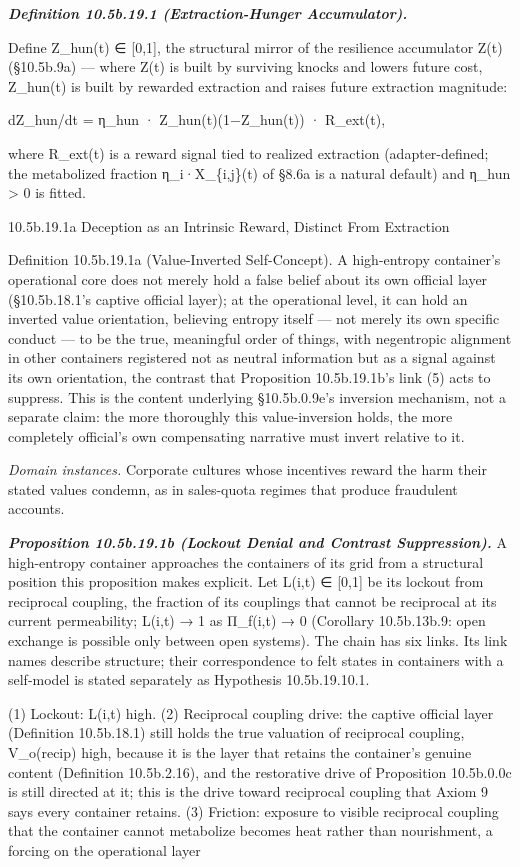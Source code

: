 \documentclass[
]{article}
\begin{document}
\emph{\textbf{Definition 10.5b.19.1 (Extraction-Hunger Accumulator).}}

Define Z\_hun(t) ∈ {[}0,1{]}, the structural mirror of the resilience
accumulator Z(t) (§10.5b.9a) --- where Z(t) is built by surviving knocks
and lowers future cost, Z\_hun(t) is built by rewarded extraction and
raises future extraction magnitude:

dZ\_hun/dt = η\_hun · Z\_hun(t)(1−Z\_hun(t)) · R\_ext(t),

where R\_ext(t) is a reward signal tied to realized extraction
(adapter-defined; the metabolized fraction η\_i·X\_\{i,j\}(t) of §8.6a
is a natural default) and η\_hun \textgreater{} 0 is fitted.

10.5b.19.1a Deception as an Intrinsic Reward, Distinct From Extraction

Definition 10.5b.19.1a (Value-Inverted Self-Concept). A high-entropy
container's operational core does not merely hold a false belief about
its own official layer (§10.5b.18.1's captive official layer); at the
operational level, it can hold an inverted value orientation, believing
entropy itself --- not merely its own specific conduct --- to be the
true, meaningful order of things, with negentropic alignment in other
containers registered not as neutral information but as a signal against
its own orientation, the contrast that Proposition 10.5b.19.1b's link
(5) acts to suppress. This is the content underlying §10.5b.0.9e's
inversion mechanism, not a separate claim: the more thoroughly this
value-inversion holds, the more completely official's own compensating
narrative must invert relative to it.

\emph{Domain instances.} Corporate cultures whose incentives reward the
harm their stated values condemn, as in sales-quota regimes that produce
fraudulent accounts.

\emph{\textbf{Proposition 10.5b.19.1b (Lockout Denial and Contrast
Suppression).}} A high-entropy container approaches the containers of
its grid from a structural position this proposition makes explicit. Let
L(i,t) ∈ {[}0,1{]} be its lockout from reciprocal coupling, the fraction
of its couplings that cannot be reciprocal at its current permeability;
L(i,t) → 1 as Π\_f(i,t) → 0 (Corollary 10.5b.13b.9: open exchange is
possible only between open systems). The chain has six links. Its link
names describe structure; their correspondence to felt states in
containers with a self-model is stated separately as Hypothesis
10.5b.19.10.1.

(1) Lockout: L(i,t) high. (2) Reciprocal coupling drive: the captive
official layer (Definition 10.5b.18.1) still holds the true valuation of
reciprocal coupling, V\_o(recip) high, because it is the layer that
retains the container's genuine content (Definition 10.5b.2.16), and the
restorative drive of Proposition 10.5b.0.0c is still directed at it;
this is the drive toward reciprocal coupling that Axiom 9 says every
container retains. (3) Friction: exposure to visible reciprocal coupling
that the container cannot metabolize becomes heat rather than
nourishment, a forcing on the operational layer
\end{document}
